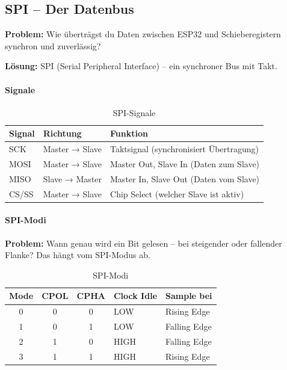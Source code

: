 \subsection{SPI – Der Datenbus}

\textbf{Problem:} Wie überträgst du Daten zwischen ESP32 und Schieberegistern synchron und zuverlässig?

\textbf{Lösung:} SPI (Serial Peripheral Interface) – ein synchroner Bus mit Takt.

\paragraph{Signale}

\begin{table}[htbp]
\centering
\begin{tabular}{@{}lll@{}}
\toprule
\textbf{Signal} & \textbf{Richtung} & \textbf{Funktion} \\
\midrule
SCK   & Master → Slave & Taktsignal (synchronisiert Übertragung) \\
MOSI  & Master → Slave & Master Out, Slave In (Daten zum Slave) \\
MISO  & Slave → Master & Master In, Slave Out (Daten vom Slave) \\
CS/SS & Master → Slave & Chip Select (welcher Slave ist aktiv) \\
\bottomrule
\end{tabular}
\caption{SPI-Signale}
\label{tab:spi-signale}
\end{table}

\paragraph{SPI-Modi}

\textbf{Problem:} Wann genau wird ein Bit gelesen – bei steigender oder fallender Flanke? Das hängt vom SPI-Modus ab.

\begin{table}[htbp]
\centering
\begin{tabular}{@{}cccll@{}}
\toprule
\textbf{Mode} & \textbf{CPOL} & \textbf{CPHA} & \textbf{Clock Idle} & \textbf{Sample bei} \\
\midrule
0 & 0 & 0 & LOW  & Rising Edge \\
1 & 0 & 1 & LOW  & Falling Edge \\
2 & 1 & 0 & HIGH & Falling Edge \\
3 & 1 & 1 & HIGH & Rising Edge \\
\bottomrule
\end{tabular}
\caption{SPI-Modi}
\label{tab:spi-modi}
\end{table}

